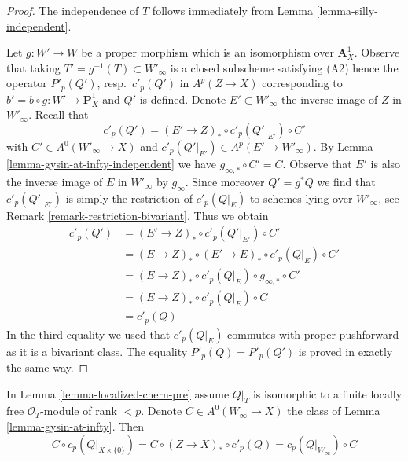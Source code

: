 \begin{proof}
The independence of $T$ follows immediately from
Lemma \ref{lemma-silly-independent}.

\medskip\noindent
Let $g : W' \to W$ be a proper morphism which is an isomorphism over
$\mathbf{A}^1_X$. Observe that taking $T' = g^{-1}(T) \subset W'_\infty$
is a closed subscheme satisfying (A2) hence the operator
$P'_p(Q')$, resp.\ $c'_p(Q')$ in $A^p(Z \to X)$
corresponding to $b' = b \circ g : W' \to \mathbf{P}^1_X$
and $Q'$ is defined. Denote $E' \subset W'_\infty$
the inverse image of $Z$ in $W'_\infty$. Recall that
$$
c'_p(Q') = (E' \to Z)_* \circ c'_p(Q'|_{E'}) \circ C'
$$
with $C' \in A^0(W'_\infty \to X)$ and
$c'_p(Q'|_{E'}) \in A^p(E' \to W'_\infty)$.
By Lemma \ref{lemma-gysin-at-infty-independent} we have
$g_{\infty, *} \circ C' = C$. Observe that $E'$ is also
the inverse image of $E$ in $W'_\infty$ by $g_\infty$.
Since moreover $Q' = g^*Q$ we find that $c'_p(Q'|_{E'})$ is simply the
restriction of $c'_p(Q|_E)$ to schemes lying over $W'_\infty$, see
Remark \ref{remark-restriction-bivariant}. Thus we obtain
\begin{align*}
c'_p(Q')
& = 
(E' \to Z)_* \circ c'_p(Q'|_{E'}) \circ C' \\
& =
(E \to Z)_* \circ (E' \to E)_* \circ c'_p(Q|_E) \circ C' \\
& =
(E \to Z)_* \circ c'_p(Q|_E) \circ g_{\infty, *} \circ C' \\
& =
(E \to Z)_* \circ c'_p(Q|_E) \circ C \\
& =
c'_p(Q)
\end{align*}
In the third equality we used that $c'_p(Q|_E)$
commutes with proper pushforward as it is a
bivariant class. The equality $P'_p(Q) = P'_p(Q')$
is proved in exactly the same way.
\end{proof}

\begin{lemma}
\label{lemma-homomorphism}
In Lemma \ref{lemma-localized-chern-pre} assume $Q|_T$ is isomorphic
to a finite locally free $\mathcal{O}_T$-module of rank $< p$.
Denote $C \in A^0(W_\infty \to X)$ the class of
Lemma \ref{lemma-gysin-at-infty}. Then
$$
C \circ c_p(Q|_{X \times \{0\}}) =
C \circ (Z \to X)_* \circ c'_p(Q) = c_p(Q|_{W_\infty}) \circ C
$$
\end{lemma}


